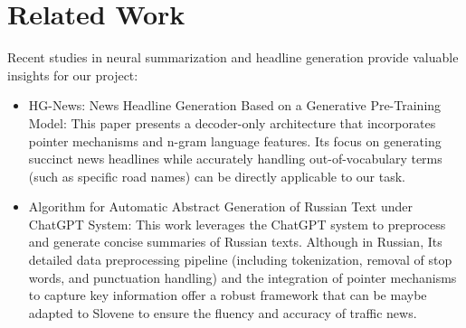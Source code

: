\documentclass[fleqn,moreauthors,10pt]{ds_report}
\begin{document}
\section{Related Work}
Recent studies in neural summarization and headline generation provide valuable insights for our project:
\begin{itemize}
    \item HG-News: News Headline Generation Based on a Generative Pre-Training Model: This paper presents a decoder-only architecture that incorporates pointer mechanisms and n-gram language features. Its focus on generating succinct news headlines while accurately handling out-of-vocabulary terms (such as specific road names) can be directly applicable to our task.

    \item Algorithm for Automatic Abstract Generation of Russian Text under ChatGPT System: This work leverages the ChatGPT system to preprocess and generate concise summaries of Russian texts. Although in Russian, Its detailed data preprocessing pipeline (including tokenization, removal of stop words, and punctuation handling) and the integration of pointer mechanisms to capture key information offer a robust framework that can be maybe adapted to Slovene to ensure the fluency and accuracy of traffic news.
\end{itemize}
\end{document}

